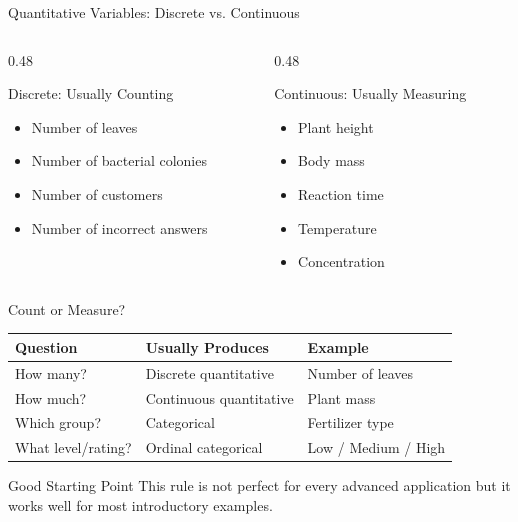 \documentclass[aspectratio=169]{beamer}
\begin{document}
\begin{frame}{Quantitative Variables: Discrete vs. Continuous}
  \begin{columns}[T]
    \begin{column}{0.48\textwidth}
      \begin{block}{Discrete: Usually Counting}
        \begin{itemize}
          \item Number of leaves
          \item Number of bacterial colonies
          \item Number of customers
          \item Number of incorrect answers
        \end{itemize}
      \end{block}
    \end{column}
    \begin{column}{0.48\textwidth}
      \begin{block}{Continuous: Usually Measuring}
        \begin{itemize}
          \item Plant height
          \item Body mass
          \item Reaction time
          \item Temperature
          \item Concentration
        \end{itemize}
      \end{block}
    \end{column}
  \end{columns}
\end{frame}

\begin{frame}{Count or Measure?}
  \begin{table}
    \centering
    \begin{tabular}{lll}
      \toprule
      \textbf{Question} & \textbf{Usually Produces} & \textbf{Example} \\
      \midrule
      How many? & Discrete quantitative & Number of leaves \\
      How much? & Continuous quantitative & Plant mass \\
      Which group? & Categorical & Fertilizer type \\
      What level/rating? & Ordinal categorical & Low / Medium / High \\
      \bottomrule
    \end{tabular}
  \end{table}
  \vspace{0.25cm}
  \begin{block}{Good Starting Point}
    This rule is not perfect for every advanced application but it works well for most introductory examples.
  \end{block}
\end{frame}
\end{document}

